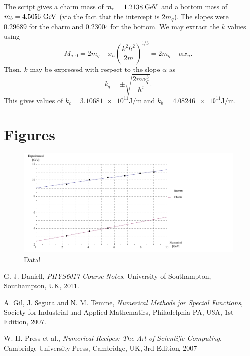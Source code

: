 \documentclass[]{article}
\begin{document}
The script gives a charm mass of $m_{c} = 1.2138\GeV$ and a bottom mass of $m_{b} = 4.5056\GeV$ (via the fact that the intercept is $2m_{q}$). The slopes were $0.29689$ for the charm and $0.23004$ for the bottom. We may extract the $k$ values using
$$M_{n,0} = 2m_{q} - x_{n}\left(\frac{k^{2}\hbar^{2}}{2m}\right)^{1/3} = 2m_{q} - \alpha x_{n}.$$
Then, $k$ may be expressed with respect to the slope $\alpha$ as
$$k_{q} = \pm\sqrt{\frac{2m\alpha_{q}^{3}}{\hbar^{2}}}.$$
This gives values of $k_{c} = \num{3.10681e11}\si{\joule\per\metre}$ and $k_{b} = \num{4.08246e11}\si{\joule\per\metre}$.


\section{Figures}\label{sec:figures}

\begin{figure}[H]
	\hspace*{-0.15\textwidth}
	\centering
	\includegraphics[scale=1.3]{experimental-numerical}
	\caption{Data!}
	\label{fig:data}
\end{figure}

\begin{thebibliography}{9}
  G. J. Daniell,
  \emph{PHYS6017 Course Notes},
  University of Southampton, Southampton, UK,
  2011.
  
  A. Gil, J. Segura and N. M. Temme,
  \emph{Numerical Methods for Special Functions},
  Society for Industrial and Applied Mathematics, Philadelphia PA, USA,
  $1$st Edition,
  2007.
  
  W. H. Press et al.,
  \emph{Numerical Recipes: The Art of Scientific Computing},
  Cambridge University Press, Cambridge, UK,
  $3$rd Edition,
  2007
  
\end{thebibliography}
\end{document}
